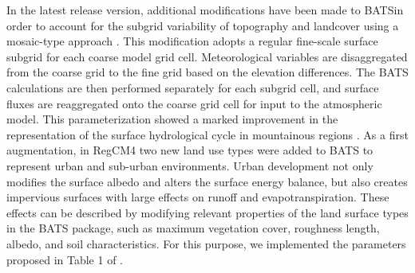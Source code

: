 In the latest release version, additional modifications have been made to
\ac{BATS}in order to account for the subgrid variability of topography and
landcover using a mosaic-type approach \citep{Giorgi03b}.  This modification
adopts a regular fine-scale surface subgrid for each coarse model grid cell.
Meteorological variables are disaggregated from the coarse grid to the fine
grid based on the elevation differences.  The \ac{BATS} calculations are then
performed separately for each subgrid cell, and surface fluxes are reaggregated
onto the coarse grid cell for input to the atmospheric model.
This parameterization showed a marked improvement in the representation of the
surface hydrological cycle in mountainous regions \citep{Giorgi03b}.
As a first augmentation, in \ac{RegCM}4 two new land use types were added to
\ac{BATS} to represent urban and sub-urban environments. Urban development not
only modifies the surface albedo and alters the surface energy balance, but
also creates impervious surfaces with large effects on runoff and
evapotranspiration.
These effects can be described by modifying relevant properties of the land
surface types in the BATS package, such as maximum vegetation cover, roughness
length, albedo, and soil characteristics. For this purpose, we implemented the
parameters proposed in Table 1 of \cite{Kueppers_08}.

